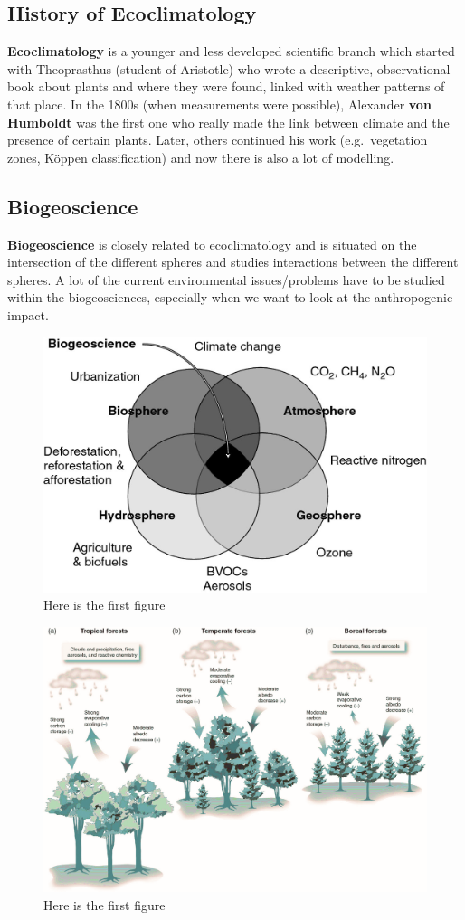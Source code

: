 \documentclass[oneside]{book}
\begin{document}
\subsection{History of Ecoclimatology}\label{history-of-ecoclimatology}

\textbf{Ecoclimatology} is a younger and less developed scientific
branch which started with Theoprasthus (student of Aristotle) who wrote
a descriptive, observational book about plants and where they were
found, linked with weather patterns of that place. In the 1800s (when
measurements were possible), Alexander \textbf{von Humboldt} was the
first one who really made the link between climate and the presence of
certain plants. Later, others continued his work (e.g.~vegetation zones,
Köppen classification) and now there is also a lot of modelling.

\subsection{Biogeoscience}\label{biogeoscience}

\textbf{Biogeoscience} is closely related to ecoclimatology and is
situated on the intersection of the different spheres and studies
interactions between the different spheres. A lot of the current
environmental issues/problems have to be studied within the
biogeosciences, especially when we want to look at the anthropogenic
impact.

\begin{figure}

{\centering \includegraphics[width=0.5\linewidth]{figures/Figure19} 

}

\caption{Here is the first figure}\label{fig:Biogeoscience}
\end{figure}

\begin{figure}

{\centering \includegraphics[width=0.5\linewidth]{figures/Figure110} 

}

\caption{Here is the first figure}\label{fig:Biogeoscience2}
\end{figure}
\end{document}

